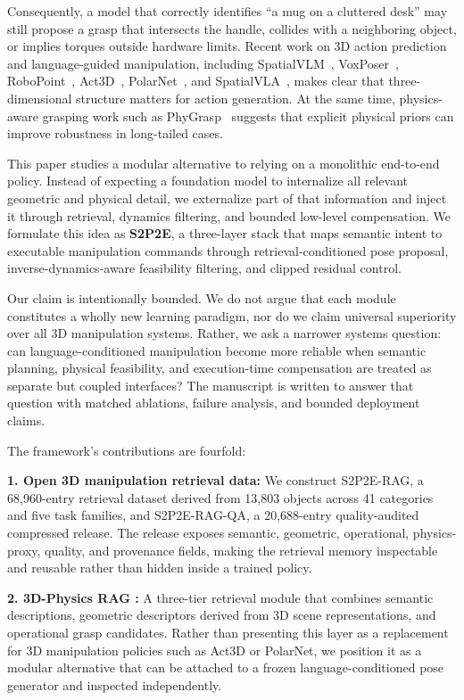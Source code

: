 \documentclass[12pt]{article}
\begin{document}
Consequently, a model that correctly identifies ``a mug on a cluttered desk'' may still propose a grasp that intersects the handle, collides with a neighboring object, or implies torques outside hardware limits. Recent work on 3D action prediction and language-guided manipulation, including SpatialVLM~\cite{chen2024spatialvlm}, VoxPoser~\cite{jiang2023voxposer}, RoboPoint~\cite{zhao2024robopoint}, Act3D~\cite{gervet2023act3d}, PolarNet~\cite{chen2023polarnet}, and SpatialVLA~\cite{qu2025spatialvla}, makes clear that three-dimensional structure matters for action generation. At the same time, physics-aware grasping work such as PhyGrasp~\cite{xiang2024phygrasp} suggests that explicit physical priors can improve robustness in long-tailed cases.

This paper studies a modular alternative to relying on a monolithic end-to-end policy. Instead of expecting a foundation model to internalize all relevant geometric and physical detail, we externalize part of that information and inject it through retrieval, dynamics filtering, and bounded low-level compensation. We formulate this idea as \textbf{S2P2E}, a three-layer stack that maps semantic intent to executable manipulation commands through retrieval-conditioned pose proposal, inverse-dynamics-aware feasibility filtering, and clipped residual control.

Our claim is intentionally bounded. We do not argue that each module constitutes a wholly new learning paradigm, nor do we claim universal superiority over all 3D manipulation systems. Rather, we ask a narrower systems question: can language-conditioned manipulation become more reliable when semantic planning, physical feasibility, and execution-time compensation are treated as separate but coupled interfaces? The manuscript is written to answer that question with matched ablations, failure analysis, and bounded deployment claims.

The framework's contributions are fourfold:

\textbf{1. Open 3D manipulation retrieval data:} We construct S2P2E-RAG, a 68,960-entry retrieval dataset derived from 13,803 objects across 41 categories and five task families, and S2P2E-RAG-QA, a 20,688-entry quality-audited compressed release. The release exposes semantic, geometric, operational, physics-proxy, quality, and provenance fields, making the retrieval memory inspectable and reusable rather than hidden inside a trained policy.

\textbf{2. 3D-Physics RAG :} A three-tier retrieval module that combines semantic descriptions, geometric descriptors derived from 3D scene representations, and operational grasp candidates. Rather than presenting this layer as a replacement for 3D manipulation policies such as Act3D or PolarNet, we position it as a modular alternative that can be attached to a frozen language-conditioned pose generator and inspected independently.
\end{document}
